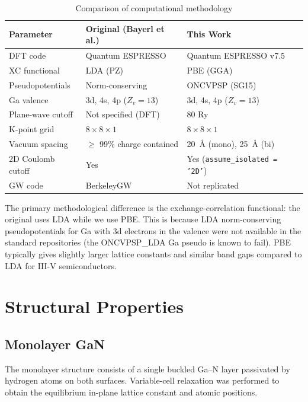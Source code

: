 \documentclass[11pt]{article}
\begin{document}
\begin{table}[H]
\centering
\caption{Comparison of computational methodology}
\label{tab:methods}
\small
\begin{tabular}{@{}lll@{}}
\toprule
\textbf{Parameter} & \textbf{Original (Bayerl et al.)} & \textbf{This Work} \\
\midrule
DFT code & Quantum ESPRESSO & Quantum ESPRESSO v7.5 \\
XC functional & LDA (PZ) & PBE (GGA) \\
Pseudopotentials & Norm-conserving & ONCVPSP (SG15) \\
Ga valence & 3d, 4s, 4p ($Z_v = 13$) & 3d, 4s, 4p ($Z_v = 13$) \\
Plane-wave cutoff & Not specified (DFT) & 80 Ry \\
K-point grid & $8 \times 8 \times 1$ & $8 \times 8 \times 1$ \\
Vacuum spacing & $\geq$ 99\% charge contained & 20~\AA{} (mono), 25~\AA{} (bi) \\
2D Coulomb cutoff & Yes & Yes (\texttt{assume\_isolated = '2D'}) \\
GW code & BerkeleyGW & Not replicated \\
\bottomrule
\end{tabular}
\end{table}

The primary methodological difference is the exchange-correlation functional: the original uses LDA while we use PBE. This is because LDA norm-conserving pseudopotentials for Ga with 3d electrons in the valence were not available in the standard repositories (the ONCVPSP\_LDA Ga pseudo is known to fail). PBE typically gives slightly larger lattice constants and similar band gaps compared to LDA for III-V semiconductors.

\section{Structural Properties}

\subsection{Monolayer GaN}

The monolayer structure consists of a single buckled Ga--N layer passivated by hydrogen atoms on both surfaces. Variable-cell relaxation was performed to obtain the equilibrium in-plane lattice constant and atomic positions.
\end{document}
